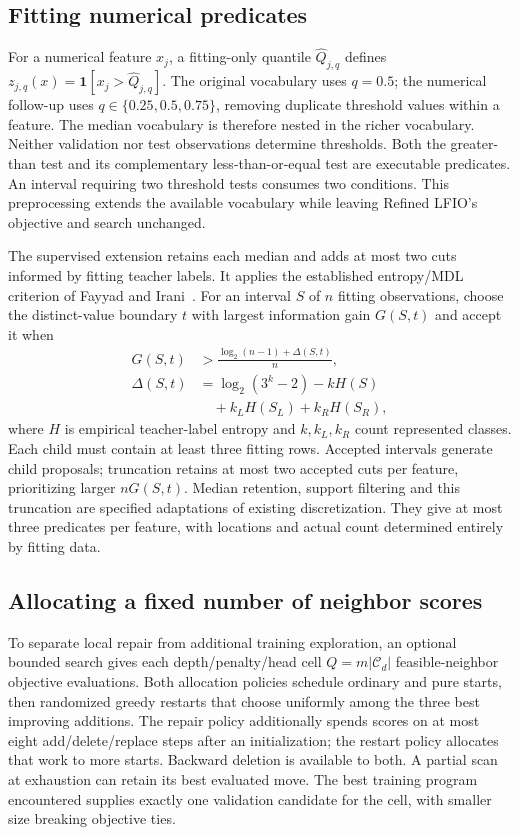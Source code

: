 \documentclass[a4paper,fleqn,review]{cas-sc}
\begin{document}
\subsection{Fitting numerical predicates}
For a numerical feature $x_j$, a fitting-only quantile $\widehat Q_{j,q}$ defines $z_{j,q}(x)=\mathbf{1}[x_j>\widehat Q_{j,q}]$. The original vocabulary uses $q=0.5$; the numerical follow-up uses $q\in\{0.25,0.5,0.75\}$, removing duplicate threshold values within a feature. The median vocabulary is therefore nested in the richer vocabulary. Neither validation nor test observations determine thresholds. Both the greater-than test and its complementary less-than-or-equal test are executable predicates. An interval requiring two threshold tests consumes two conditions. This preprocessing extends the available vocabulary while leaving Refined LFIO's objective and search unchanged.

The supervised extension retains each median and adds at most two cuts informed by fitting teacher labels. It applies the established entropy/MDL criterion of Fayyad and Irani~\citep{fayyad1993}. For an interval $S$ of $n$ fitting observations, choose the distinct-value boundary $t$ with largest information gain $G(S,t)$ and accept it when
\begin{equation}
\begin{aligned}
G(S,t)&>\frac{\log_2(n-1)+\Delta(S,t)}{n},\\
\Delta(S,t)&=\log_2(3^k-2)-kH(S)\\
&\quad+k_LH(S_L)+k_RH(S_R),
\end{aligned}
\end{equation}
where $H$ is empirical teacher-label entropy and $k,k_L,k_R$ count represented classes. Each child must contain at least three fitting rows. Accepted intervals generate child proposals; truncation retains at most two accepted cuts per feature, prioritizing larger $nG(S,t)$. Median retention, support filtering and this truncation are specified adaptations of existing discretization. They give at most three predicates per feature, with locations and actual count determined entirely by fitting data.

\subsection{Allocating a fixed number of neighbor scores}\label{sec:scored-work}
To separate local repair from additional training exploration, an optional bounded search gives each depth/penalty/head cell $Q=m|\mathcal C_d|$ feasible-neighbor objective evaluations. Both allocation policies schedule ordinary and pure starts, then randomized greedy restarts that choose uniformly among the three best improving additions. The repair policy additionally spends scores on at most eight add/delete/replace steps after an initialization; the restart policy allocates that work to more starts. Backward deletion is available to both. A partial scan at exhaustion can retain its best evaluated move. The best training program encountered supplies exactly one validation candidate for the cell, with smaller size breaking objective ties.
\end{document}
